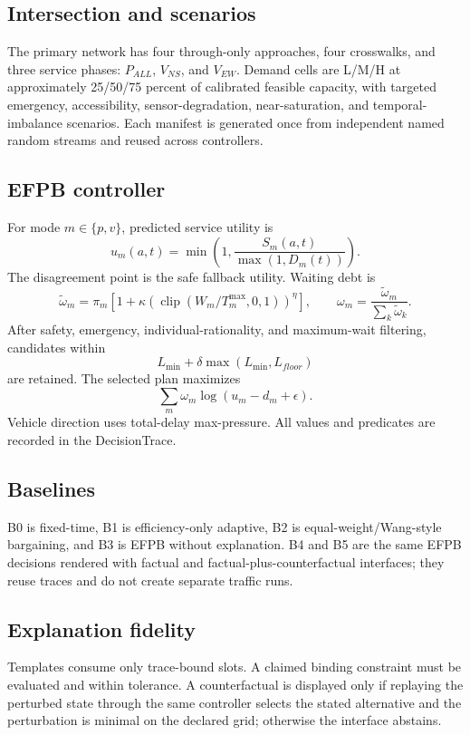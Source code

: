 \documentclass[11pt,a4paper]{article}
\begin{document}
\subsection{Intersection and scenarios}
The primary network has four through-only approaches, four crosswalks, and three service phases: $P_{ALL}$, $V_{NS}$, and $V_{EW}$. Demand cells are L/M/H at approximately 25/50/75 percent of calibrated feasible capacity, with targeted emergency, accessibility, sensor-degradation, near-saturation, and temporal-imbalance scenarios. Each manifest is generated once from independent named random streams and reused across controllers.

\subsection{EFPB controller}
For mode $m\in\{p,v\}$, predicted service utility is
\[
u_m(a,t)=\min\left(1,\frac{S_m(a,t)}{\max(1,D_m(t))}\right).
\]
The disagreement point is the safe fallback utility. Waiting debt is
\[
\tilde\omega_m=\pi_m\left[1+\kappa\left(\operatorname{clip}(W_m/T_m^{\max},0,1)\right)^\eta\right],
\qquad \omega_m=\frac{\tilde\omega_m}{\sum_k\tilde\omega_k}.
\]
After safety, emergency, individual-rationality, and maximum-wait filtering, candidates within
\[
L_{\min}+\delta\max(L_{\min},L_{floor})
\]
are retained. The selected plan maximizes
\[
\sum_m\omega_m\log(u_m-d_m+\epsilon).
\]
Vehicle direction uses total-delay max-pressure. All values and predicates are recorded in the DecisionTrace.

\subsection{Baselines}
B0 is fixed-time, B1 is efficiency-only adaptive, B2 is equal-weight/Wang-style bargaining, and B3 is EFPB without explanation. B4 and B5 are the same EFPB decisions rendered with factual and factual-plus-counterfactual interfaces; they reuse traces and do not create separate traffic runs.

\subsection{Explanation fidelity}
Templates consume only trace-bound slots. A claimed binding constraint must be evaluated and within tolerance. A counterfactual is displayed only if replaying the perturbed state through the same controller selects the stated alternative and the perturbation is minimal on the declared grid; otherwise the interface abstains.
\end{document}
